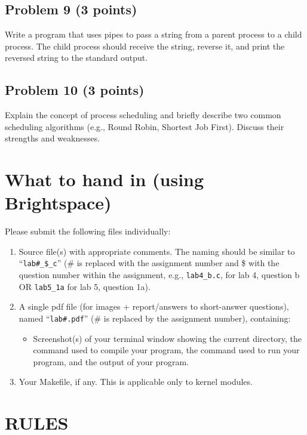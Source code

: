 \documentclass{article}
\begin{document}
\subsection*{Problem 9 (3 points)}

Write a program that uses pipes to pass a string from a parent process to a child process. The child process should receive the string, reverse it, and print the reversed string to the standard output.


\subsection*{Problem 10 (3 points)}

Explain the concept of process scheduling and briefly describe two common scheduling algorithms (e.g., Round Robin, Shortest Job First).  Discuss their strengths and weaknesses.


\section*{What to hand in (using Brightspace)}

Please submit the following files individually:

\begin{enumerate}
    \item Source file(s) with appropriate comments. The naming should be similar to “\texttt{lab\#\_\$\_c}” (\# is replaced with the assignment number and \$ with the question number within the assignment, e.g., \texttt{lab4\_b.c}, for lab 4, question b OR \texttt{lab5\_1a} for lab 5, question 1a).
    \item A single pdf file (for images + report/answers to short-answer questions), named “\texttt{lab\#.pdf}” (\# is replaced by the assignment number), containing:
    \begin{itemize}
        \item Screenshot(s) of your terminal window showing the current directory, the command used to compile your program, the command used to run your program, and the output of your program.
    \end{itemize}
    \item Your Makefile, if any. This is applicable only to kernel modules.
\end{enumerate}

\section*{RULES}
\end{document}
